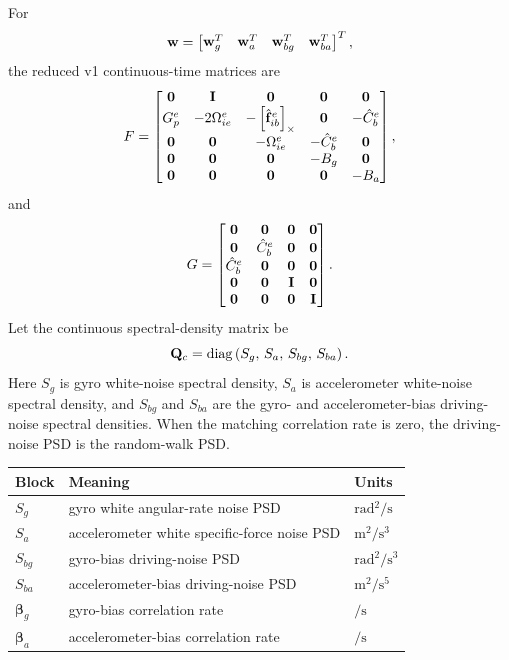 For
\begin{equation}
\mathbf{w}=
\begin{bmatrix}
\mathbf{w}_g^T &
\mathbf{w}_a^T &
\mathbf{w}_{bg}^T &
\mathbf{w}_{ba}^T
\end{bmatrix}^{T},
\end{equation}
the reduced v1 continuous-time matrices are
\begin{equation}
F =
\begin{bmatrix}
\mathbf{0} & \mathbf{I} & \mathbf{0} & \mathbf{0} & \mathbf{0}\\
G_p^e & -2\Omega_{ie}^{e} & -\left[\hat{\mathbf{f}}_{ib}^{e}\right]_{\times} & \mathbf{0} & -\hat{C}_b^e\\
\mathbf{0} & \mathbf{0} & -\Omega_{ie}^{e} & -\hat{C}_b^e & \mathbf{0}\\
\mathbf{0} & \mathbf{0} & \mathbf{0} & -B_g & \mathbf{0}\\
\mathbf{0} & \mathbf{0} & \mathbf{0} & \mathbf{0} & -B_a
\end{bmatrix},
\label{eq:v1_f_matrix}
\end{equation}
and
\begin{equation}
G =
\begin{bmatrix}
\mathbf{0} & \mathbf{0} & \mathbf{0} & \mathbf{0}\\
\mathbf{0} & \hat{C}_b^e & \mathbf{0} & \mathbf{0}\\
\hat{C}_b^e & \mathbf{0} & \mathbf{0} & \mathbf{0}\\
\mathbf{0} & \mathbf{0} & \mathbf{I} & \mathbf{0}\\
\mathbf{0} & \mathbf{0} & \mathbf{0} & \mathbf{I}
\end{bmatrix}.
\label{eq:v1_g_matrix}
\end{equation}
Let the continuous spectral-density matrix be
\begin{equation}
\mathbf{Q}_c =
\operatorname{diag}
\left(
S_g,\,
S_a,\,
S_{bg},\,
S_{ba}
\right).
\end{equation}
Here $S_g$ is gyro white-noise spectral density, $S_a$ is accelerometer
white-noise spectral density, and $S_{bg}$ and $S_{ba}$ are the gyro- and
accelerometer-bias driving-noise spectral densities. When the matching
correlation rate is zero, the driving-noise PSD is the random-walk PSD.
\begin{center}
\begin{tabular}{lll}
\toprule
Block & Meaning & Units \\
\midrule
$S_g$ & gyro white angular-rate noise PSD & $\si{\radian^2\per\second}$ \\
$S_a$ & accelerometer white specific-force noise PSD & $\si{\meter^2\per\second^3}$ \\
$S_{bg}$ & gyro-bias driving-noise PSD & $\si{\radian^2\per\second^3}$ \\
$S_{ba}$ & accelerometer-bias driving-noise PSD & $\si{\meter^2\per\second^5}$ \\
$\boldsymbol{\beta}_g$ & gyro-bias correlation rate & $\si{\per\second}$ \\
$\boldsymbol{\beta}_a$ & accelerometer-bias correlation rate & $\si{\per\second}$ \\
\bottomrule
\end{tabular}
\end{center}


